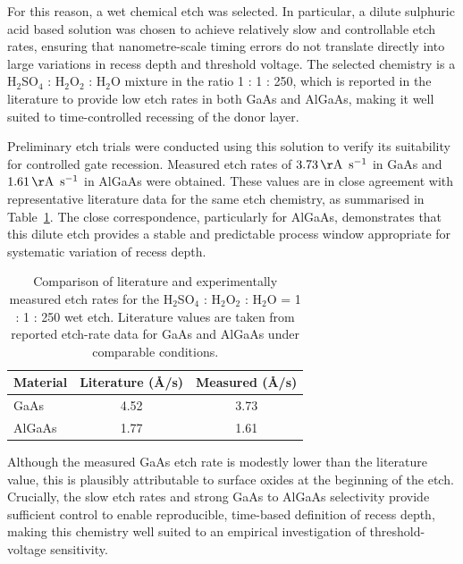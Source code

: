 \vspace{2mm}

For this reason, a wet chemical etch was selected. In particular, a
dilute sulphuric acid based solution was chosen to achieve relatively
slow and controllable etch rates, ensuring that nanometre-scale timing
errors do not translate directly into large variations in recess depth
and threshold voltage. The selected chemistry is a
H$_2$SO$_4$ : H$_2$O$_2$ : H$_2$O mixture in the ratio 1 : 1 : 250, which
is reported in the literature to provide low etch rates in both GaAs
and AlGaAs, making it well suited to time-controlled recessing of the
donor layer. \cite{guan_etching}

\vspace{2mm}

Preliminary etch trials were conducted using this solution to verify
its suitability for controlled gate recession. Measured etch rates of
$3.73\,\mathrm{\AA~\,s^{-1}}$ in GaAs and
$1.61\,\mathrm{\AA~\,s^{-1}}$ in AlGaAs were obtained. These values are
in close agreement with representative literature data for the same
etch chemistry, as summarised in
Table~\ref{tab:gate_recess_etch_rates}. The close correspondence,
particularly for AlGaAs, demonstrates that this dilute etch provides a
stable and predictable process window appropriate for systematic
variation of recess depth. \cite{guan_etching}

\begin{table}[htbp]
\centering
\caption{Comparison of literature and experimentally measured etch
rates for the H$_2$SO$_4$ : H$_2$O$_2$ : H$_2$O = 1 : 1 : 250 wet etch.
Literature values are taken from reported etch-rate data for GaAs and
AlGaAs under comparable conditions.}
\label{tab:gate_recess_etch_rates}
\begin{tabular}{lcc}
\hline
Material & Literature (\AA/s) & Measured (\AA/s) \\
\hline
GaAs   & 4.52 & 3.73 \\
AlGaAs & 1.77 & 1.61 \\
\hline
\end{tabular}
\end{table}

\vspace{2mm}

Although the measured GaAs etch rate is modestly lower than the
literature value, this is plausibly attributable to surface oxides at the beginning of the etch.
Crucially, the slow etch rates and strong GaAs to AlGaAs selectivity provide sufficient
control to enable reproducible, time-based definition of recess depth,
making this chemistry well suited to an empirical investigation of
threshold-voltage sensitivity.

